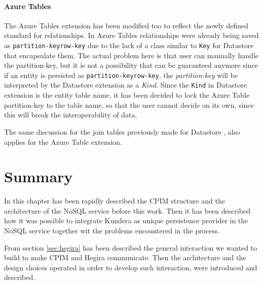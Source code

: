 \paragraph{Azure Tables} The Azure Tables extension has been modified too to reflect the newly defined standard for relationships. In Azure Tables relationships were already being saved as \texttt{partition-key\textunderscore row-key} due to the lack of a class similar to \texttt{Key} for Datastore that encapsulate them. The actual problem here is that user can manually handle the partition-key, but it is not a possibility that can be guaranteed anymore since if an entity is persisted as \texttt{partition-key\textunderscore row-key}, the \textit{partition-key} will be interpreted by the Datastore extension as a \textit{Kind}.
Since the \texttt{Kind} in Datastore extension is the entity table name, it has been decided to lock the Azure Table partition-key to the table name, so that the user cannot decide on its own, since this will break the interoperability of data.

\noindent The same discussion for the join tables previously made for Datastore , also applies for the Azure Table extension.

\section{Summary}
In this chapter has been rapidly described the CPIM structure and the architecture of the NoSQL service before this work. Then it has been described how it was possible to integrate Kundera as unique persistence provider in the NoSQL service together wit the problems encountered in the process.

\noindent From section \ref{sec:hegira} has been described the general interaction we wanted to build to make CPIM and Hegira communicate. Then the architecture and the design choices operated in order to develop such interaction, were introduced and described.
